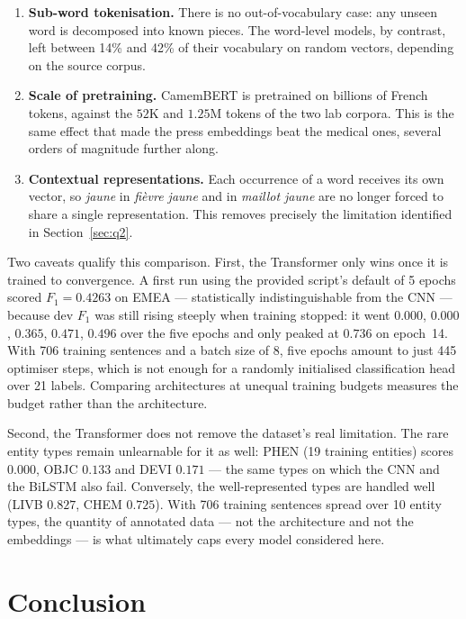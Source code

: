 \documentclass[11pt,a4paper]{article}
\begin{document}
\begin{enumerate}
  \item \textbf{Sub-word tokenisation.} There is no out-of-vocabulary case: any unseen word is
    decomposed into known pieces. The word-level models, by contrast, left between 14\% and
    42\% of their vocabulary on random vectors, depending on the source corpus.
  \item \textbf{Scale of pretraining.} CamemBERT is pretrained on billions of French tokens,
    against the $52$K and $1.25$M tokens of the two lab corpora. This is the same effect that
    made the press embeddings beat the medical ones, several orders of magnitude further along.
  \item \textbf{Contextual representations.} Each occurrence of a word receives its own vector,
    so \emph{jaune} in \emph{fièvre jaune} and in \emph{maillot jaune} are no longer forced to
    share a single representation. This removes precisely the limitation identified in
    Section~\ref{sec:q2}.
\end{enumerate}

Two caveats qualify this comparison. First, the Transformer only wins once it is trained to
convergence. A first run using the provided script's default of 5 epochs scored $F_1=0.4263$ on
EMEA --- statistically indistinguishable from the CNN --- because dev $F_1$ was still rising
steeply when training stopped: it went $0.000$, $0.000$, $0.365$, $0.471$, $0.496$ over the
five epochs and only peaked at $0.736$ on epoch~14. With 706 training sentences and a batch
size of 8, five epochs amount to just 445 optimiser steps, which is not enough for a randomly
initialised classification head over 21 labels. Comparing architectures at unequal training
budgets measures the budget rather than the architecture.

Second, the Transformer does not remove the dataset's real limitation. The rare entity types
remain unlearnable for it as well: PHEN (19 training entities) scores $0.000$, OBJC $0.133$ and
DEVI $0.171$ --- the same types on which the CNN and the BiLSTM also fail. Conversely, the
well-represented types are handled well (LIVB $0.827$, CHEM $0.725$). With 706 training
sentences spread over 10 entity types, the quantity of annotated data --- not the architecture
and not the embeddings --- is what ultimately caps every model considered here.

\section{Conclusion}
\label{sec:conclusion}
\end{document}
